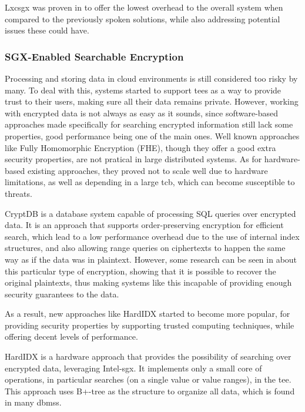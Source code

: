 Lxcsgx was proven in \cite{lxcsgxPaper} to offer the lowest overhead to the overall system when compared to the previously spoken solutions, while also addressing potential issues these could have. 


\subsubsection{SGX-Enabled Searchable Encryption}

Processing and storing data in cloud environments is still considered too risky by many. To deal with this, systems started to support \gls{tee}s as a way to provide trust to their users, making sure all their data remains private. 
However, working with encrypted data is not always as easy as it sounds, since software-based approaches made specifically for searching encrypted information still lack some properties, good performance being one of the main ones. Well known approaches like Fully Homomorphic Encryption (FHE), though they offer a good extra security properties, are not pratical in large distributed systems. As for hardware-based existing approaches, they proved not to scale well due to hardware limitations, as well as depending in a large \gls{tcb}, which can become susceptible to threats.

CryptDB \cite{cryptDBPaper} is a database system capable of processing SQL queries over encrypted data. It is an approach that supports order-preserving encryption for efficient search, which lead to a low performance overhead due to the use of internal index structures, and also allowing range queries on ciphertexts to happen the same way as if the data was in plaintext. However, some research can be seen in \cite{naveedPaper} about this particular type of encryption, showing that it is possible to recover the original plaintexts, thus making systems like this incapable of providing enough security guarantees to the data.

As a result, new approaches like HardIDX started to become more popular, for providing security properties by supporting trusted computing techniques, while offering decent levels of performance.

HardIDX \cite{hardIDXPaper} is a hardware approach that provides the possibility of searching over encrypted data, leveraging Intel-\gls{sgx}. It implements only a small core of operations, in particular searches (on a single value or value ranges), in the \gls{tee}.
This approach uses B+-tree as the structure to organize all data, which is found in many \gls{dbms}s.

